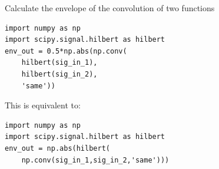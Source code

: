 \documentclass{beamer}
\begin{document}
\begin{frame}[fragile]{Calculate the envelope of the convolution of two functions}
\small
\begin{verbatim}
import numpy as np
import scipy.signal.hilbert as hilbert
env_out = 0.5*np.abs(np.conv(
    hilbert(sig_in_1),
    hilbert(sig_in_2),
    'same'))
\end{verbatim}
This is equivalent to:
\begin{verbatim}
import numpy as np
import scipy.signal.hilbert as hilbert
env_out = np.abs(hilbert(
    np.conv(sig_in_1,sig_in_2,'same')))
\end{verbatim}
\end{frame}
\end{document}
